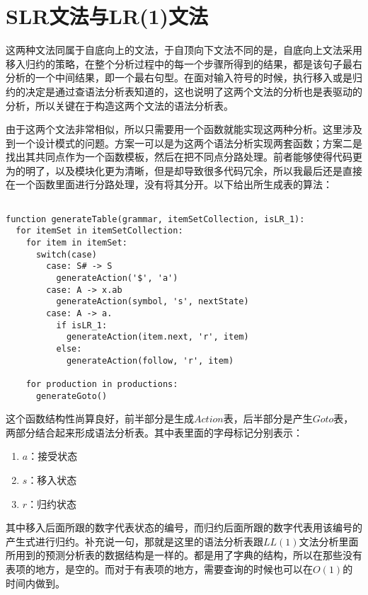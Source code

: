 \section{SLR文法与LR(1)文法}

这两种文法同属于自底向上的文法，于自顶向下文法不同的是，自底向上文法采用移入归约的策略，在整个分析过程中的每一个步骤所得到的结果，都是该句子最右分析的一个中间结果，即一个最右句型。在面对输入符号的时候，执行移入或是归约的决定是通过查语法分析表知道的，这也说明了这两个文法的分析也是表驱动的分析，所以关键在于构造这两个文法的语法分析表。

由于这两个文法非常相似，所以只需要用一个函数就能实现这两种分析。这里涉及到一个设计模式的问题。方案一可以是为这两个语法分析实现两套函数；方案二是找出其共同点作为一个函数模板，然后在把不同点分路处理。前者能够使得代码更为的明了，以及模块化更为清晰，但是却导致很多代码冗余，所以我最后还是直接在一个函数里面进行分路处理，没有将其分开。以下给出所生成表的算法：

\begin{verbatim}

function generateTable(grammar, itemSetCollection, isLR_1):
  for itemSet in itemSetCollection:
    for item in itemSet:
      switch(case)
        case: S# -> S
          generateAction('$', 'a')
        case: A -> x.ab
          generateAction(symbol, 's', nextState)
        case: A -> a.
          if isLR_1:
            generateAction(item.next, 'r', item)
          else:
            generateAction(follow, 'r', item)

    for production in productions:
      generateGoto()

\end{verbatim}

这个函数结构性尚算良好，前半部分是生成$Action$表，后半部分是产生$Goto$表，两部分结合起来形成语法分析表。其中表里面的字母标记分别表示：

\begin{enumerate}
    \item $a$：接受状态
    \item $s$：移入状态
    \item $r$：归约状态
\end{enumerate}

其中移入后面所跟的数字代表状态的编号，而归约后面所跟的数字代表用该编号的产生式进行归约。补充说一句，那就是这里的语法分析表跟$LL(1)$文法分析里面所用到的预测分析表的数据结构是一样的。都是用了字典的结构，所以在那些没有表项的地方，是空的。而对于有表项的地方，需要查询的时候也可以在$O(1)$的时间内做到。

\newpage

